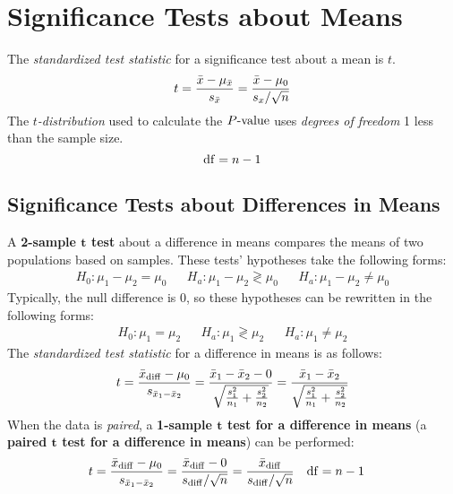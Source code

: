 \documentclass[../AP_Statistics.tex]{subfiles}
\begin{document}
		\section{Significance Tests about Means}
			The \emph{standardized test statistic} for a significance test about a mean is $t$.
			\[t = \frac{\bar{x} - \mu_{\bar{x}}}{s_{\bar{x}}} = \frac{\bar{x} - \mu_0}{s_x/\sqrt{n}}\]
			The \emph{$t$-distribution} used to calculate the $P\text{-value}$ uses \emph{degrees of freedom} 1 less than the sample size.
			\[\operatorname{\mathrm{df}} = n - 1\]
			\subsection*{Significance Tests about Differences in Means}
				A \textbf{2-sample $\bm{t}$ test} about a difference in means compares the means of two populations based on samples. These tests' hypotheses take the following forms:
				\begin{align*}
					H_0: \mu_1 - \mu_2 = \mu_0 && H_a: \mu_1 - \mu_2 \gtrless \mu_0 && H_a: \mu_1 - \mu_2 \ne \mu_0
				\end{align*}
				Typically, the null difference is 0, so these hypotheses can be rewritten in the following forms:
				\begin{align*}
					H_0: \mu_1 = \mu_2 && H_a: \mu_1 \gtrless \mu_2 && H_a: \mu_1 \ne \mu_2
				\end{align*}
				The \emph{standardized test statistic} for a difference in means is as follows:
				\[t = \frac{\bar{x}_{\mathrm{diff}} - \mu_0}{s_{\bar{x}_1 - \bar{x}_2}} = \frac{\bar{x}_1 - \bar{x}_2 - 0}{\sqrt{\frac{s_1^2}{n_1} + \frac{s_2^2}{n_2}}} = \frac{\bar{x}_1 - \bar{x}_2}{\sqrt{\frac{s_1^2}{n_1} + \frac{s_2^2}{n_2}}}\]
				When the data is \emph{paired}, a \textbf{1-sample $\bm{t}$ test for a difference in means} (a \textbf{paired $\bm{t}$ test for a difference in means}) can be performed:
				\begin{align*}
					t &= \frac{\bar{x}_{\mathrm{diff}} - \mu_0}{s_{\bar{x}_1 - \bar{x}_2}} = \frac{\bar{x}_{\mathrm{diff}} - 0}{s_{\mathrm{diff}}/\sqrt{n}} = \frac{\bar{x}_{\mathrm{diff}}}{s_{\mathrm{diff}}/\sqrt{n}} & \operatorname{\mathrm{df}} &= n - 1
				\end{align*}
\end{document}
